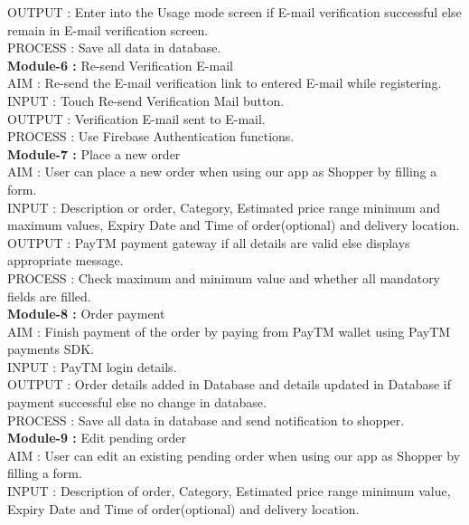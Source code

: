 \documentclass{report}
\begin{document}
                    OUTPUT : Enter into the Usage mode screen if E-mail verification successful else remain in E-mail verification screen.\\
                    PROCESS : Save all data in database.\\
\newline
\textbf{Module-6 :} Re-send Verification E-mail\\
					AIM : Re-send the E-mail verification link to entered E-mail while registering.\\
					INPUT : Touch Re-send Verification Mail button.\\
					OUTPUT : Verification E-mail sent to E-mail.\\
					PROCESS : Use Firebase Authentication functions.\\
\newline
\textbf{Module-7 :} Place a new order\\
					AIM : User can place a new order when using our app as Shopper by filling a form.\\
INPUT : Description or order, Category, Estimated price range minimum and maximum values, Expiry Date and Time of order(optional) and delivery location.\\
					OUTPUT : PayTM payment gateway if all details are valid else displays appropriate message.\\
					PROCESS : Check maximum and minimum value and whether all mandatory fields are filled.\\
\newline
\textbf{Module-8 :} Order payment\\
					AIM : Finish payment of the order by paying from PayTM wallet using PayTM payments SDK.\\
					INPUT : PayTM login details.\\
					OUTPUT : Order details added in Database and details updated in Database if payment successful else no change in database.\\
					PROCESS : Save all data in database and send notification to shopper.\\
\newline
\textbf{Module-9 :} Edit pending order\\
					AIM : User can edit an existing pending order when using our app as Shopper by filling a form.\\
					INPUT : Description of order, Category, Estimated price range minimum value, Expiry Date and Time of order(optional) and delivery location.\\
\end{document}
